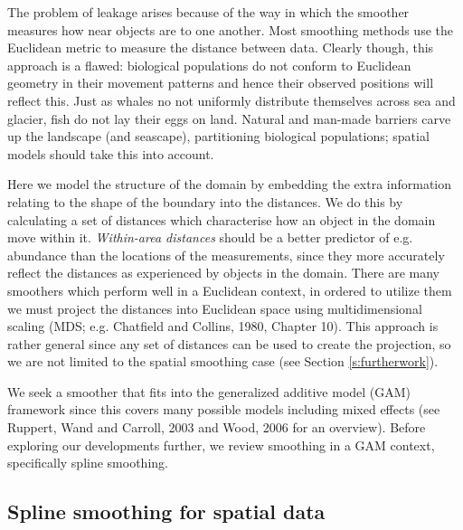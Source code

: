 \documentclass[useAMS, referee]{biom}
\begin{document}
The problem of leakage arises because of the way in which the smoother measures how near objects are to one another. Most smoothing methods use the Euclidean metric to measure the distance between data. Clearly though, this approach is a flawed: biological populations do not conform to Euclidean geometry in their movement patterns and hence their observed positions will reflect this. Just as whales no not uniformly distribute themselves across sea and glacier, fish do not lay their eggs on land. Natural and man-made barriers carve up the landscape (and seascape), partitioning biological populations; spatial models should take this into account. 

Here we model the structure of the domain by embedding the extra information relating to the shape of the boundary into the distances. We do this by calculating a set of distances which characterise how an object in the domain move within it. \textit{Within-area distances} should be a better predictor of e.g. abundance than the locations of the measurements, since they more accurately reflect the distances as experienced by objects in the domain. There are many smoothers which perform well in a Euclidean context, in ordered to utilize them we must project the distances into Euclidean space using multidimensional scaling (MDS; e.g. Chatfield and Collins, 1980, Chapter 10). This approach is rather general since any set of distances can be used to create the projection, so we are not limited to the spatial smoothing case (see Section \ref{s:furtherwork}). 

We seek a smoother that fits into the generalized additive model (GAM) framework since this covers many possible models including mixed effects (see Ruppert, Wand and Carroll, 2003 and Wood, 2006 for an overview). Before exploring our developments further, we review smoothing in a GAM context, specifically spline smoothing.

\subsection{Spline smoothing for spatial data}
\end{document}
